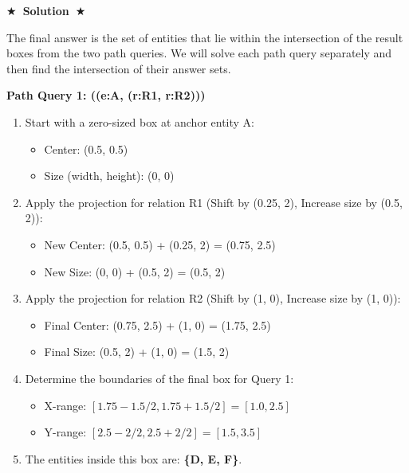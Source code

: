 \documentclass{article}
\numberwithin{figure}{section}
\newcommand{\Solution}[1]{%
    {%
        \medskip
        \color{red}
        \bf $\bigstar$~\sf\textbf{Solution}~$\bigstar$ \sf
        #1
    }
    \bigskip
}
\begin{document}
\Solution{
	The final answer is the set of entities that lie within the intersection of the result boxes from the two path queries. We will solve each path query separately and then find the intersection of their answer sets.
	
	\textbf{Path Query 1: ((e:A, (r:R1, r:R2)))}
	\begin{enumerate}
		\item Start with a zero-sized box at anchor entity A:
		\begin{itemize}
			\item Center: (0.5, 0.5)
			\item Size (width, height): (0, 0)
		\end{itemize}
		\item Apply the projection for relation R1 (Shift by (0.25, 2), Increase size by (0.5, 2)):
		\begin{itemize}
			\item New Center: (0.5, 0.5) + (0.25, 2) = (0.75, 2.5)
			\item New Size: (0, 0) + (0.5, 2) = (0.5, 2)
		\end{itemize}
		\item Apply the projection for relation R2 (Shift by (1, 0), Increase size by (1, 0)):
		\begin{itemize}
			\item Final Center: (0.75, 2.5) + (1, 0) = (1.75, 2.5)
			\item Final Size: (0.5, 2) + (1, 0) = (1.5, 2)
		\end{itemize}
		\item Determine the boundaries of the final box for Query 1:
		\begin{itemize}
			\item X-range: $[1.75 - 1.5/2, 1.75 + 1.5/2] = [1.0, 2.5]$
			\item Y-range: $[2.5 - 2/2, 2.5 + 2/2] = [1.5, 3.5]$
		\end{itemize}
		\item The entities inside this box are: \textbf{\{D, E, F\}}.
	\end{enumerate}
	
}
\end{document}
